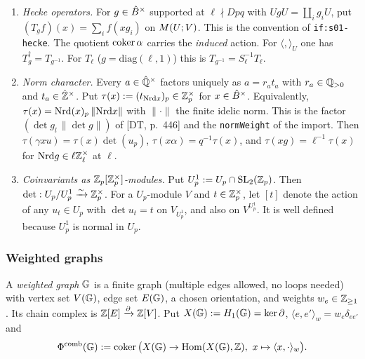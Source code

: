 \begin{enumerate}[label=(C\arabic*)]
  \emph{Factor-$2$ hypothesis} (stage 01, Prop.~s01-adjoint(c)). For $\pi:\XB{U'}\to\XB U$, one has $\nu\circ\pi_*=\mathrm{tr}\circ\nu'$
  only if $-1\in U'$ or $-1\notin U$. Otherwise $\mathrm{tr}\circ\nu'=2\,\nu\circ\pi_*$. For the degeneracies $s_0,s_1$ of this stage the
  hypothesis \emph{always holds}: $U'=\Uzero qU$ differs from $U$ (and $\alpha^{-1}U'\alpha$ from $U$) only at $q$, and $-1\in\Iw_q$, so
  $-1\in U'\iff-1\in U$. The same holds for the unfolding identity used for $\varepsilon$ in Thm~\ref{thm:s03-iharaH0}: there the
  orbit sizes are $w_x/w_y=|\Gamma_x|/|\Gamma_y|$. This stage never passes from $\hat\cO^\times$ to $\Uone N$. Any such level change
  (for example comparing $\Phicomb(\GDR_q(\Uone{Mp^s}))$ with level $1$, or in stage 04) must carry the factor $2$ explicitly whenever
  $-1\in U$ and $-1\notin U'$.
\item \emph{Hecke operators.} For $g\in\hat{B}^\times$ supported at $\ell\nmid Dpq$ with $UgU=\coprod_ig_iU$, put
  $(T_gf)(x)=\sum_if(xg_i)$ on $M(U;V)$. This is the convention of \texttt{if:s01-hecke}. The quotient $\operatorname{coker}\alpha$ carries the
  \emph{induced} action. For $\langle,\rangle_U$ one has $T_g^\dagger=T_{g^{-1}}$. For $T_\ell$ ($g=\mathrm{diag}(\ell,1)$) this
  is $T_{g^{-1}}=S_\ell^{-1}T_\ell$.
\item \emph{Norm character.} Every $a\in\hat{\mathbb{Q}}^\times$ factors uniquely as $a=r_at_a$ with $r_a\in\mathbb{Q}_{>0}$ and
  $t_a\in\hat{\mathbb{Z}}^\times$. Put $\tau(x):=(t_{\mathrm{Nrd} x})_p\in\mathbb{Z}_p^\times$ for $x\in\hat{B}^\times$. Equivalently,
  $\tau(x)=\mathrm{Nrd}(x)_p\,\|\mathrm{Nrd} x\|$ with $\|\cdot\|$ the finite idelic norm. This is the factor $(\det g_l\,\|\det g\|)$ of [DT, p.~446]
  and the \texttt{normWeight} of the import. Then $\tau(\gamma xu)=\tau(x)\det(u_p)$, $\tau(x\alpha)=q^{-1}\tau(x)$, and
  $\tau(xg)=\ell^{-1}\tau(x)$ for $\mathrm{Nrd} g\in\ell\mathbb{Z}_\ell^\times$ at $\ell$.
\item \emph{Coinvariants as $\mathbb{Z}_p[\mathbb{Z}_p^\times]$-modules.} Put $U_p^1:=U_p\cap\mathrm{SL}_2(\mathbb{Z}_p)$. Then $\det:U_p/U_p^1\xrightarrow\sim\mathbb{Z}_p^\times$.
  For a $U_p$-module $V$ and $t\in\mathbb{Z}_p^\times$, let $[t]$ denote the action of any $u_t\in U_p$ with $\det u_t=t$ on
  $V_{U^1_p}$, and also on $V^{U^1_p}$. It is well defined because $U^1_p$ is normal in $U_p$.
\end{enumerate}

\subsubsection{Weighted graphs}
\begin{definition}\label{def:s03-graph}
A \emph{weighted graph} $\mathbb{G}$ is a finite graph (multiple edges allowed, no loops needed) with vertex set $V(\mathbb{G})$, edge set $E(\mathbb{G})$, a
chosen orientation, and weights $w_e\in\mathbb{Z}_{\ge1}$. Its chain complex is $\mathbb{Z}[E]\xrightarrow\partial\mathbb{Z}[V]$. Put
$X(\mathbb{G}):=H_1(\mathbb{G})=\ker\partial$, $\langle e,e'\rangle_w=w_e\delta_{ee'}$ and
\[\Phicomb(\G):=\coker\big(X(\G)\to\Hom(X(\G),\Z),\ x\mapsto\langle x,\cdot\rangle_w\big).\]
\end{definition}

